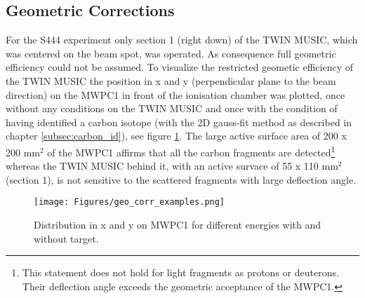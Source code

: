 \subsection{Geometric Corrections}
For the S444 experiment only section 1 (right down) of the TWIN MUSIC, which was centered on the beam spot, was operated. As consequence full geometric efficiency could not be assumed. To visualize the restricted geometic efficiency of the TWIN MUSIC the position in x and y (perpendicular plane to the beam direction) on the MWPC1 in front of the ionisation chamber was plotted, once without any conditions on the TWIN MUSIC and once with the condition of having identified a carbon isotope (with the 2D gauss-fit method as described in chapter \ref{subsec:carbon_id}), see figure \ref{fig:mw1_xy}. The large active surface area of 200 x 200 mm$^{2}$ of the MWPC1 affirms that all the carbon fragments are detected\footnote{This statement does not hold for light fragments as protons or deuterons. Their deflection angle exceeds the geometric acceptance of the MWPC1.} whereas the TWIN MUSIC behind it, with an active survace of 55 x 110 mm$^{2}$ (section 1), is not sensitive to the scattered fragments with large deflection angle.\newline
\begin{figure}[htpb]
    \centering
    \texttt{[image: Figures/geo\_corr\_examples.png]}
    \caption{
    Distribution in x and y on MWPC1 for different energies with and without target. 
     }
    \label{fig:mw1_xy}
\end{figure}

